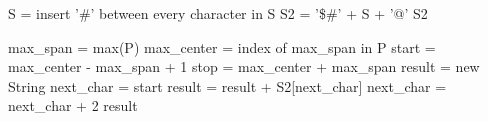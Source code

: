 \documentclass[paper=a4, fontsize=11pt]{scrartcl} %
\numberwithin{equation}{section} %
\numberwithin{figure}{section} %
\numberwithin{table}{section} %
\begin{document}
\begin{algorithmic}
	\State S = insert '\#' between every character in S
	\State S2 = '\$\#' + S + '@'
	\State \Return S2
\EndFunction
\end{algorithmic}

\begin{algorithmic}
	\State max\_span = max(P)
	\State max\_center = index of max\_span in P
	\State start = max\_center - max\_span + 1 
	\State stop = max\_center + max\_span
	\State result = new String
	\State next\_char = start
		\State result = result + S2[next\_char] 
		\State next\_char = next\_char + 2
	\EndWhile
	\State \Return result
\EndFunction
\end{algorithmic}
\end{document}
